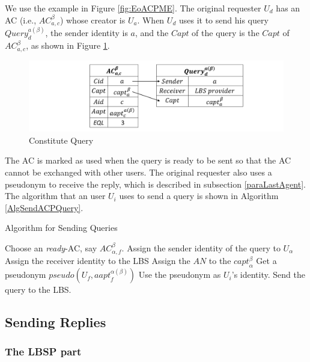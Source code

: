 We use the example in Figure \ref{fig:EoACPME}. The original requester $U_d$ has an AC (i.e., ${AC}^{\beta }_{a,c}$) whose creator is $U_a$. When $U_d$ uses it to send his query ${Query}^{a\left(\beta\right)}_d$, the sender identity is $a$, and the $Capt$ of the query is the $Capt$ of ${AC}^{\beta }_{a,c}$, as shown in Figure \ref{fig:ConstituteQuery}.

\begin{figure} [H]
\centering 
\includegraphics[width=6.0in]{figures/FIG_4_5_Constitute_Query.png}
\caption{Constitute Query} 
\label{fig:ConstituteQuery} %
\end{figure}

The AC is marked as used when the query is ready to be sent so that the AC cannot be exchanged with other users. The original requester also uses a pseudonym to receive the reply, which is described in subsection \ref{paraLastAgent}. The algorithm that an user $U_i$ uses to send a query is shown in Algorithm \ref{AlgSendACPQuery}.


\begin{algorithm} [hbtp]
\caption{Algorithm for Sending Queries}\label{AlgSendACPQuery}
\begin{algorithmic}[1]
 {}
\State Choose an \textit{ready}-AC, say ${AC}_{\alpha,f}^{\beta}$.
\State Assign the sender identity of the query to $U_{\alpha}$
\State Assign the receiver identity to the LBS
\State Assign the $AN$ to the ${capt}_{\alpha}^{\beta}$
\State Get a pseudonym $pseudo\left(U_f,{aapt}_f^{\alpha \left(\beta \right)}\right)$
\State Use the pseudonym as $U_i$’s identity.
\State Send the query to the LBS.
\EndProcedure
\end{algorithmic}
\end{algorithm}

\subsection{Sending Replies}


\subsubsection{The LBSP part}

